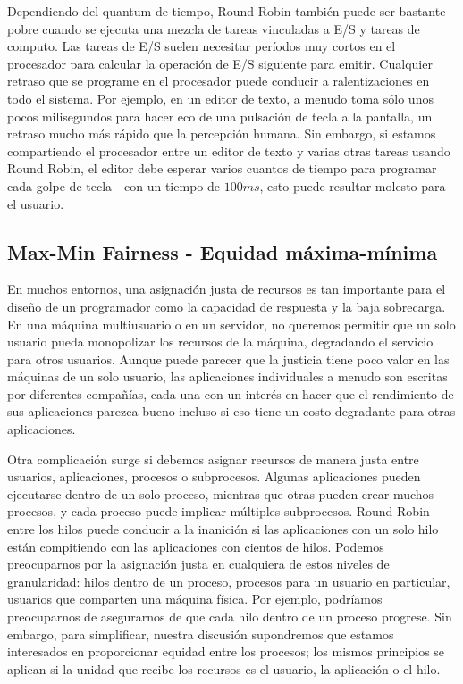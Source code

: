 \documentclass[10pt]{book}
\begin{document}
Dependiendo del quantum de tiempo, Round Robin también puede ser bastante pobre cuando se ejecuta una mezcla de tareas vinculadas a E/S y tareas de computo. Las tareas de E/S suelen necesitar períodos muy cortos en el procesador para calcular la operación de E/S siguiente para emitir. Cualquier retraso que se programe en el procesador puede conducir a ralentizaciones en todo el sistema. Por ejemplo, en un editor de texto, a menudo toma sólo unos pocos milisegundos para hacer eco de una pulsación de tecla a la pantalla, un retraso mucho más rápido que la percepción humana. Sin embargo, si estamos compartiendo el procesador entre un editor de texto y varias otras tareas usando Round Robin, el editor debe esperar varios cuantos de tiempo para programar cada golpe de tecla - con un tiempo de $100 ms$, esto puede resultar molesto para el usuario.

\subsection{Max-Min Fairness - Equidad máxima-mínima}
En muchos entornos, una asignación justa de recursos es tan importante para el diseño de un programador como la capacidad de respuesta y la baja sobrecarga. En una máquina multiusuario o en un servidor, no queremos permitir que un solo usuario pueda monopolizar los recursos de la máquina, degradando el servicio para otros usuarios. Aunque puede parecer que la justicia tiene poco valor en las máquinas de un solo usuario, las aplicaciones individuales a menudo son escritas por diferentes compañías, cada una con un interés en hacer que el rendimiento de sus aplicaciones parezca bueno incluso si eso tiene un costo degradante para otras aplicaciones.

Otra complicación surge si debemos asignar recursos de manera justa entre usuarios, aplicaciones, procesos o subprocesos. Algunas aplicaciones pueden ejecutarse dentro de un solo proceso, mientras que otras pueden crear muchos procesos, y cada proceso puede implicar múltiples subprocesos. Round Robin entre los hilos puede conducir a la inanición si las aplicaciones con un solo hilo están compitiendo con las aplicaciones con cientos de hilos. Podemos preocuparnos por la asignación justa en cualquiera de estos niveles de granularidad: hilos dentro de un proceso, procesos para un usuario en particular, usuarios que comparten una máquina física. Por ejemplo, podríamos preocuparnos de asegurarnos de que cada hilo dentro de un proceso progrese. Sin embargo, para simplificar, nuestra discusión supondremos que estamos interesados en proporcionar equidad entre los procesos; los mismos principios se aplican si la unidad que recibe los recursos es el usuario, la aplicación o el hilo.
\end{document}
